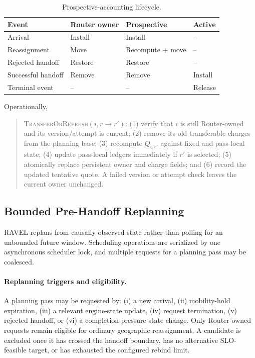\documentclass[letterpaper,twocolumn,10pt]{article}
\begin{document}
\begin{table}[t]
    \centering
    \small
    \caption{Prospective-accounting lifecycle.}
    \label{tab:appendix:accounting-lifecycle}
    \setlength{\tabcolsep}{3.5pt}

    \begin{tabular}{
        @{}
        p{}
        p{}
        p{}
        p{}
        @{}
    }
        \toprule
        \textbf{Event} &
        \textbf{Router owner} &
        \textbf{Prospective} &
        \textbf{Active} \\
        \midrule
        Arrival            & Install & Install          & --      \\
        Reassignment       & Move    & Recompute + move & --      \\
        Rejected handoff   & Restore & Restore          & --      \\
        Successful handoff & Remove  & Remove           & Install \\
        Terminal event     & --      & --               & Release \\
        \bottomrule
    \end{tabular}
\end{table}
Operationally,
\begin{quote}
\textsc{TransferOrRefresh}$(i,r\!\rightarrow\!r')$:
(1) verify that $i$ is still Router-owned and its version/attempt is current;
(2) remove its old transferable charges from the planning base;
(3) recompute $Q_{i,r'}$ against fixed and pass-local state;
(4) update pass-local ledgers immediately if $r'$ is selected;
(5) atomically replace persistent owner and charge fields; and
(6) record the updated tentative quote.
A failed version or attempt check leaves the current owner unchanged.
\end{quote}


\subsection{Bounded Pre-Handoff Replanning}
\label{sec:appendix:replanning}

RAVEL replans from causally observed state rather than polling for an
unbounded future window.
Scheduling operations are serialized by one asynchronous scheduler lock, and
multiple requests for a planning pass may be coalesced.

\paragraph{Replanning triggers and eligibility.}
A planning pass may be requested by:
(i) a new arrival,
(ii) mobility-hold expiration,
(iii) a relevant engine-state update,
(iv) request termination,
(v) rejected handoff, or
(vi) a completion-pressure state change.
Only Router-owned requests remain eligible for ordinary geographic
reassignment.
A candidate is excluded once it has crossed the handoff boundary, has no
alternative SLO-feasible target, or has exhausted the configured rebind limit.
\end{document}
